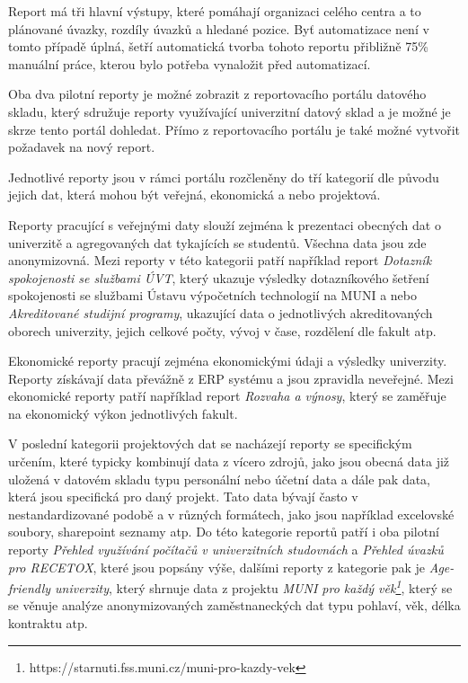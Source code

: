 \documentclass[
  digital,     %
  twoside,     %
  lof,         %
  lot,         %
]{fithesis4}
\begin{document}
Report má tři hlavní výstupy, které pomáhají organizaci celého centra a to plánované úvazky, rozdíly úvazků a hledané pozice. Byť automatizace není v tomto případě úplná, šetří automatická tvorba tohoto reportu přibližně 75\% manuální práce, kterou bylo potřeba vynaložit před automatizací.

Oba dva pilotní reporty je možné zobrazit z reportovacího portálu datového skladu, který sdružuje reporty využívající univerzitní datový sklad a je možné je skrze tento portál dohledat. Přímo z reportovacího portálu je také možné vytvořit požadavek na nový report.

Jednotlivé reporty jsou v rámci portálu rozčleněny do tří kategorií dle původu jejich dat, která mohou být veřejná, ekonomická a nebo projektová. 

Reporty pracující s veřejnými daty slouží zejména k prezentaci obecných dat o univerzitě a agregovaných dat tykajících se studentů. Všechna data jsou zde anonymizovná. Mezi reporty v této kategorii patří například report \emph{Dotazník spokojenosti se službami ÚVT}, který ukazuje výsledky dotazníkového šetření spokojenosti se službami Ústavu výpočetních technologií na MUNI a nebo \emph{Akreditované studijní programy}, ukazující data o jednotlivých akreditovaných oborech univerzity, jejich celkové počty, vývoj v čase, rozdělení dle fakult atp.

Ekonomické reporty pracují zejména ekonomickými údaji a výsledky univerzity. Reporty získávají data převážně z ERP systému a jsou zpravidla neveřejné. Mezi ekonomické reporty patří například report \emph{Rozvaha a výnosy}, který se zaměřuje na ekonomický výkon jednotlivých fakult.

V poslední kategorii projektových dat se nacházejí reporty se specifickým určením, které typicky kombinují data z vícero zdrojů, jako jsou obecná data již uložená v datovém skladu typu personální nebo účetní data a dále pak data, která jsou specifická pro daný projekt. Tato data bývají často v nestandardizované podobě a v různých formátech, jako jsou například excelovské soubory, sharepoint seznamy atp. Do této kategorie reportů patří i oba pilotní reporty \emph{Přehled využívání počítačů v univerzitních studovnách} a \emph{Přehled úvazků pro RECETOX}, které jsou popsány výše, dalšími reporty z kategorie pak je \emph{Age-friendly univerzity}, který shrnuje data z projektu \emph{MUNI pro každý věk\footnote{https://starnuti.fss.muni.cz/muni-pro-kazdy-vek}}, který se se věnuje analýze anonymizovaných zaměstnaneckých dat typu pohlaví, věk, délka kontraktu atp.
\end{document}
